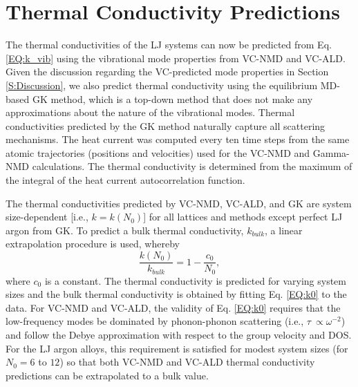 \documentclass[12pt,twocolumn,iop]{/usr/share/texmf/tex/latex/iop/iopart}[/usr/share/texmf/tex/latex/iop/]
\begin{document}


\section{\label{S:Thermal Conductivity}Thermal Conductivity Predictions}

The thermal conductivities of the LJ systems can now be predicted from 
Eq. \eqref{EQ:k_vib} using the vibrational mode properties 
from VC-NMD and VC-ALD. Given the discussion regarding the 
VC-predicted mode properties in Section \ref{S:Discussion}, 
we also predict thermal conductivity using the equilibrium 
MD-based GK method, which is a top-down method that does not make any 
approximations about the nature of the vibrational modes. 
Thermal conductivities predicted by the GK method 
naturally capture all scattering mechanisms.
\cite{landry_complex_2008,he_thermal_2011,he_lattice_2012} 
The heat current was computed every ten time steps from the same atomic 
trajectories (positions and velocities) used for the VC-NMD and 
Gamma-NMD calculations.  The thermal conductivity is 
determined from the maximum of the integral of the heat 
current autocorrelation function.

The thermal conductivities predicted by VC-NMD, VC-ALD, and GK are system 
size-dependent [i.e., $k = k(N_0)$] for all lattices and methods except 
perfect LJ argon from GK.\cite{mcgaughey_quantitative_2004} 
To predict a bulk thermal conductivity, $k_{bulk}$,  
a linear extrapolation procedure is 
used, whereby 
\begin{equation}\label{EQ:k0}
\frac{k(N_0)}{k_{bulk}} = 1 - \frac{c_0}{N_0},
\end{equation}
where $c_0$ is a constant.\cite{turney_predicting_2009,esfarjani_heat_2011,shiomi_thermal_2011} The thermal conductivity 
is predicted for varying system sizes and the bulk thermal conductivity is 
obtained by fitting Eq. \eqref{EQ:k0} to the data. 
For VC-NMD and VC-ALD, the validity of Eq. \eqref{EQ:k0}  
requires that the low-frequency modes be dominated by 
phonon-phonon scattering (i.e., $\tau\ \propto \omega^{-2}$) and  
follow the Debye approximation 
with respect to the group velocity and DOS.
\cite{shiomi_thermal_2011,esfarjani_heat_2011} For the LJ 
argon alloys, this requirement is satisfied for modest system sizes 
(for $N_0 = 6$ to $12$) so that both VC-NMD and VC-ALD thermal 
conductivity predictions can be extrapolated to a bulk value. 
\end{document}
